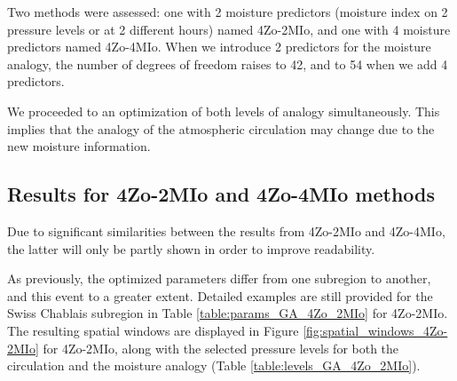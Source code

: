 \documentclass[5p]{elsarticle}
\begin{document}
Two methods were assessed: one with 2 moisture predictors (moisture index on 2 pressure levels or at 2 different hours) named 4Zo-2MIo, and one with 4 moisture predictors named 4Zo-4MIo. When we introduce 2 predictors for the moisture analogy, the number of degrees of freedom raises to 42, and to 54 when we add 4 predictors.

We proceeded to an optimization of both levels of analogy simultaneously. This implies that the analogy of the atmospheric circulation may change due to the new moisture information.


\subsection{Results for 4Zo-2MIo and 4Zo-4MIo methods}

Due to significant similarities between the results from 4Zo-2MIo and 4Zo-4MIo, the latter will only be partly shown in order to improve readability.

As previously, the optimized parameters differ from one subregion to another, and this event to a greater extent. Detailed examples are still provided for the Swiss Chablais subregion in Table \ref{table:params_GA_4Zo_2MIo} for 4Zo-2MIo. The resulting spatial windows are displayed in Figure \ref{fig:spatial_windows_4Zo-2MIo} for 4Zo-2MIo, along with the selected pressure levels for both the circulation and the moisture analogy (Table \ref{table:levels_GA_4Zo_2MIo}). 
\end{document}
